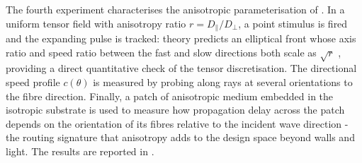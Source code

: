 The fourth experiment characterises the anisotropic parameterisation of . 
In a uniform tensor field with anisotropy ratio $r = D_{\parallel}/D_{\perp}$, a point stimulus is fired and the expanding pulse is tracked: theory predicts an elliptical front whose axis ratio and speed ratio between the fast and slow directions both scale as $\sqrt{r}$ \cite{keener1991eikonal}, providing a direct quantitative check of the tensor discretisation. 
The directional speed profile $c(\theta)$ is measured by probing along rays at several orientations to the fibre direction. 
Finally, a patch of anisotropic medium embedded in the isotropic substrate is used to measure how propagation delay across the patch depends on the orientation of its fibres relative to the incident wave direction - the routing signature that anisotropy adds to the design space beyond walls and light. 
The results are reported in .
